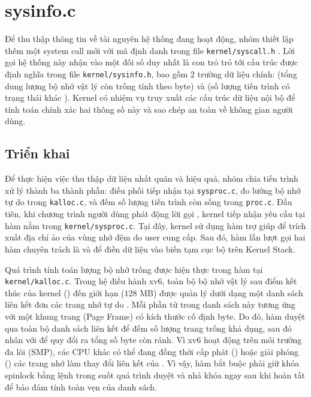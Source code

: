 \section{sysinfo.c}
Để thu thập thông tin về tài nguyên hệ thống đang hoạt động, nhóm thiết lập thêm một system call mới với mã định danh 
 trong file \texttt{kernel/syscall.h} \cite{hcmus_os_lab2}. Lời gọi hệ thống này nhận 
vào một đối số duy nhất là con trỏ trỏ tới cấu trúc  được định nghĩa trong file \texttt{kernel/sysinfo.h}, 
bao gồm $2$ trường dữ liệu chính:  (tổng dung lượng bộ nhớ vật lý còn trống tính theo byte) và  
(số lượng tiến trình có trạng thái khác ). Kernel có nhiệm vụ truy xuất các cấu trúc dữ liệu nội bộ để tính toán 
chính xác hai thông số này và sao chép an toàn về không gian người dùng.

\subsection{Triển khai}
Để thực hiện việc thu thập dữ liệu nhất quán và hiệu quả, nhóm chia
tiến trình xử lý thành ba thành phần: điều phối tiếp nhận tại \texttt{sysproc.c},
đo lường bộ nhớ tự do trong \texttt{kalloc.c}, và đếm số lượng tiến trình còn sống
trong \texttt{proc.c}. Đầu tiên, khi chương trình người dùng phát động lời gọi ,
kernel tiếp nhận yêu cầu tại hàm  nằm trong
\texttt{kernel/sysproc.c}. Tại đây, kernel sử dụng hàm trợ giúp 
để trích xuất địa chỉ ảo của vùng nhớ đệm do user cung cấp. Sau đó, hàm lần lượt
gọi hai hàm chuyên trách là  và  để
điền dữ liệu vào biến tạm  cục bộ trên Kernel Stack.

Quá trình tính toán lượng bộ nhớ trống được hiện thực trong hàm 
tại \texttt{kernel/kalloc.c}. Trong hệ điều hành xv6, toàn bộ bộ nhớ vật lý sau
điểm kết thúc của kernel () đến giới hạn  ($128$ MB) được
quản lý dưới dạng một danh sách liên kết đơn các trang nhớ tự do .
Mỗi phần tử trong danh sách này tương ứng với một khung trang (Page Frame) có kích
thước cố định  byte. Do đó, hàm  duyệt qua
toàn bộ danh sách liên kết để đếm số lượng trang trống khả dụng, sau đó nhân với
 để quy đổi ra tổng số byte còn rảnh. Vì xv6 hoạt động trên môi trường
đa lõi (SMP), các CPU khác có thể đang đồng thời cấp phát () hoặc giải
phóng () các trang nhớ làm thay đổi liên kết của . Vì vậy,
hàm bắt buộc phải giữ khóa spinlock bằng lệnh  trong suốt
quá trình duyệt và nhả khóa  ngay sau khi hoàn tất để bảo
đảm tính toàn vẹn của danh sách.

